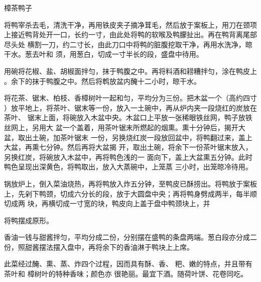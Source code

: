 \begin{recipe}{樟茶鸭子}

\ingredients


\cooking

\step 将鸭宰杀去毛，清洗干净，再用铁皮夹子摘净茸毛，然后放于案板上，用刀在颈项
上接近鸭背处开一口，长约一寸，由此处将鸭的软喉及鸭朦扯出。再在鸭背离尾部尽头处
横割一刀，约二寸长，由此刀口中将鸭的脏腹挖取干净，再用水洗净，晾干水。葱去叶和
须，用葱白，切成一寸半长的段，盛盘中待用。

\step 用碗将花椒、盐、胡椒面拌匀，抹于鸭腹之中。再将料酒和耢糟拌匀，涂在鸭皮上
。余下的抹于鸭腹之中。然后将鹎放盆内醃十二小时，晾干水。

\step 将花茶、锯末、柏枝、香樟树叶一起和匀，平均分为三份。把木盆一个（高约四寸
）放平地上，将茶叶、锯末等一份，放入一土碗中，再从炉内夹一段烧红的炭放在茶叶、
锯末上面，将碗放入木盆中央。木盆口上平放一张稀眼铁丝网，鸭子放铁丝网上，另用大
盆一个盖着，用茶叶锯末所燃起的烟熏。熏十分钟后，揭开大盆，取出土碗，加茶叶锯末
一份，另换烧红炭一段放回盆中，将鸭翻过来，盖上大盆，再熏七分钟。然后再将大盆揭
开，取出土碗，将余下一份茶叶锯末放入，另换红炭，将碗放入木盆中，再将鸭色浅的一
面向下，盖上大盆熏五分钟。此时鸭色呈现出深黄色，将鸭取出，放入大蒸碗中，上笼蒸
三小时，出笼晾冷待用。

\step 锅放炉上，倒入菜油烧热，再将鸭放入炸五分钟，至鸭皮已酥捞出。将鸭放于案板
上，先剁下鸭颈，切成六分长的段，放于大圆盘中央；再将鸭身劈成两半，每半顺切成两
块，再横切成一寸宽的块，鸭皮向上盖于盘中鸭颈块上，并

将鸭摆成原形。

\step 香油一钱与甜酱拌匀，平均分成二份，分别摆在盛鸭的条盘两端。葱白段亦分成二
份，照甜酱摆法摆入盘中，再将余下的香油淋于鸭块上上席。

\notes

此菜经过醃、熏、蒸、炸四个过程，因而具有酥、香、 粑、嫩的特点，并且带有茶叶和
樟树叶的特种香味；颜色亦 很艳丽。最宜下酒。随荷叶饼、花卷同吃。

\end{recipe}

